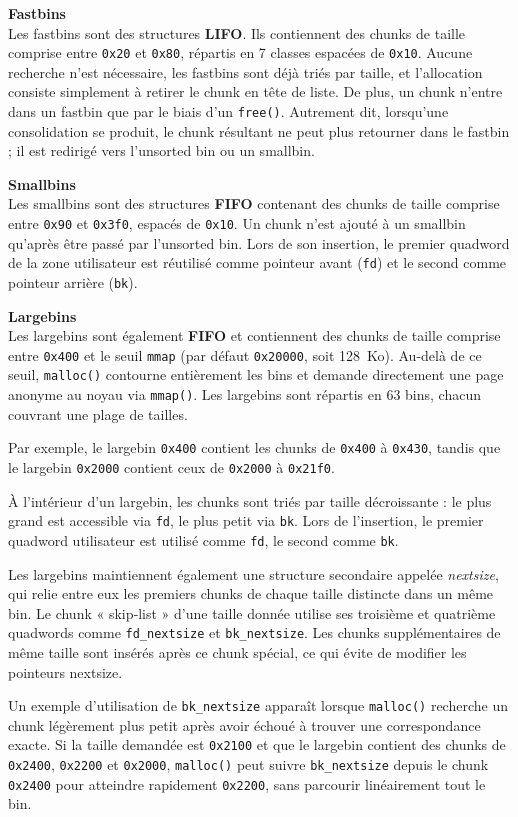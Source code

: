 \vp

\noindent\textbf{Fastbins}\\
Les fastbins sont des structures \textbf{LIFO}.
Ils contiennent des chunks de taille comprise entre \texttt{0x20} et \texttt{0x80},
répartis en 7 classes espacées de \texttt{0x10}.
Aucune recherche n'est nécessaire, les fastbins sont déjà triés par taille, et
l'allocation consiste simplement à retirer le chunk en tête de liste.
De plus, un chunk n'entre dans un fastbin que par le biais d'un \texttt{free()}.
Autrement dit, lorsqu'une consolidation se produit, le chunk résultant ne peut plus
retourner dans le fastbin ; il est redirigé vers l'unsorted bin ou un smallbin.

\vp

\noindent\textbf{Smallbins}\\
Les smallbins sont des structures \textbf{FIFO} contenant des chunks de taille comprise
entre \texttt{0x90} et \texttt{0x3f0}, espacés de \texttt{0x10}.
Un chunk n'est ajouté à un smallbin qu'après être passé par l'unsorted bin.
Lors de son insertion, le premier quadword de la zone utilisateur est réutilisé comme
pointeur avant (\texttt{fd}) et le second comme pointeur arrière (\texttt{bk}).

\vp

\noindent\textbf{Largebins}\\
Les largebins sont également \textbf{FIFO} et contiennent des chunks de taille comprise
entre \texttt{0x400} et le seuil \texttt{mmap} (par défaut \texttt{0x20000}, soit 128~Ko).
Au-delà de ce seuil, \texttt{malloc()} contourne entièrement les bins et demande
directement une page anonyme au noyau via \texttt{mmap()}.
Les largebins sont répartis en 63 bins, chacun couvrant une plage de tailles.

Par exemple, le largebin \texttt{0x400} contient les chunks de \texttt{0x400} à
\texttt{0x430}, tandis que le largebin \texttt{0x2000} contient ceux de
\texttt{0x2000} à \texttt{0x21f0}.

À l'intérieur d'un largebin, les chunks sont triés par taille décroissante :
le plus grand est accessible via \texttt{fd}, le plus petit via \texttt{bk}.
Lors de l'insertion, le premier quadword utilisateur est utilisé comme \texttt{fd},
le second comme \texttt{bk}.

Les largebins maintiennent également une structure secondaire appelée \textit{nextsize},
qui relie entre eux les premiers chunks de chaque taille distincte dans un même bin.
Le chunk « skip‑list » d'une taille donnée utilise ses troisième et quatrième quadwords
comme \texttt{fd\_nextsize} et \texttt{bk\_nextsize}.
Les chunks supplémentaires de même taille sont insérés après ce chunk spécial, ce qui
évite de modifier les pointeurs nextsize.

Un exemple d'utilisation de \texttt{bk\_nextsize} apparaît lorsque \texttt{malloc()}
recherche un chunk légèrement plus petit après avoir échoué à trouver une correspondance
exacte.
Si la taille demandée est \texttt{0x2100} et que le largebin contient des chunks de
\texttt{0x2400}, \texttt{0x2200} et \texttt{0x2000}, \texttt{malloc()} peut suivre
\texttt{bk\_nextsize} depuis le chunk \texttt{0x2400} pour atteindre rapidement
\texttt{0x2200}, sans parcourir linéairement tout le bin.
